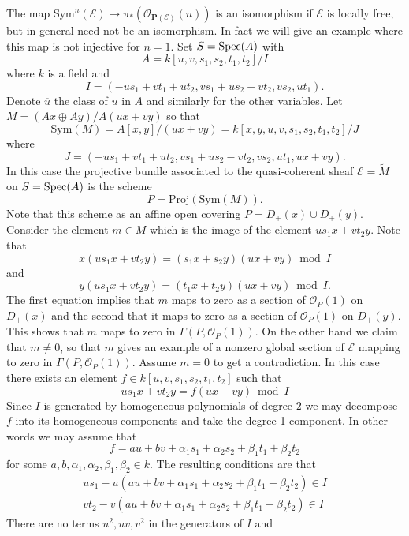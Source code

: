 \begin{example}
\label{example-projective-bundle}
The map $\text{Sym}^n(\mathcal{E}) \to
\pi_*(\mathcal{O}_{\mathbf{P}(\mathcal{E})}(n))$
is an isomorphism if $\mathcal{E}$ is locally free, but in general
need not be an isomorphism. In fact we will give an example where
this map is not injective for $n = 1$. Set $S = \mathop{\rm Spec}(A)$ with
$$
A = k[u, v, s_1, s_2, t_1, t_2]/I
$$
where $k$ is a field and
$$
I = (-us_1 + vt_1 + ut_2, vs_1 + us_2 - vt_2, vs_2, ut_1).
$$
Denote $\overline{u}$ the class of $u$ in $A$ and similarly for
the other variables.
Let $M = (Ax \oplus Ay)/A(\overline{u}x + \overline{v}y)$ so that
$$
\text{Sym}(M) = A[x, y]/(\overline{u}x + \overline{v}y)
= k[x, y, u, v, s_1, s_2, t_1, t_2]/J
$$
where 
$$
J = (-us_1 + vt_1 + ut_2, vs_1 + us_2 - vt_2, vs_2, ut_1, ux + vy).
$$
In this case the projective bundle associated to the quasi-coherent
sheaf $\mathcal{E} = \widetilde{M}$ on $S = \mathop{\rm Spec}(A)$ is the scheme
$$
P =
\text{Proj}(\text{Sym}(M)).
$$
Note that this scheme as an affine open covering
$P = D_{+}(x) \cup D_{+}(y)$.
Consider the element
$m \in M$ which is the image of the element
$us_1x + vt_2y$. Note that
$$
x(us_1x + vt_2y) = (s_1x + s_2y)(ux + vy) \bmod I
$$
and
$$
y(us_1x + vt_2y) = (t_1x + t_2y)(ux + vy) \bmod I.
$$
The first equation implies that $m$ maps to zero as a
section of $\mathcal{O}_P(1)$ on $D_{+}(x)$ and the second
that it maps to zero as a section of $\mathcal{O}_P(1)$ on $D_{+}(y)$.
This shows that $m$ maps to zero in $\Gamma(P, \mathcal{O}_P(1))$.
On the other hand we claim that $m \not = 0$, so that $m$ gives
an example of a nonzero global section of $\mathcal{E}$ mapping to zero
in $\Gamma(P, \mathcal{O}_P(1))$. Assume $m = 0$
to get a contradiction. In this case there exists
an element $f \in k[u, v, s_1, s_2, t_1, t_2]$ such that
$$
us_1x + vt_2y = f(ux + vy) \bmod I
$$
Since $I$ is generated by homogeneous polynomials of degree $2$ we
may decompose $f$ into its homogeneous components and take the
degree 1 component. In other words we may assume that
$$
f = au + bv + \alpha_1s_1 + \alpha_2s_2 + \beta_1t_1 + \beta_2t_2
$$
for some $a, b, \alpha_1, \alpha_2, \beta_1, \beta_2 \in k$.
The resulting conditions are that
$$
\begin{matrix}
us_1 - u(au + bv + \alpha_1s_1 + \alpha_2s_2 + \beta_1t_1 + \beta_2t_2)
\in I \\
vt_2 - v(au + bv + \alpha_1s_1 + \alpha_2s_2 + \beta_1t_1 + \beta_2t_2)
\in I
\end{matrix}
$$
There are no terms $u^2, uv, v^2$ in the generators of $I$ and

\end{example}
